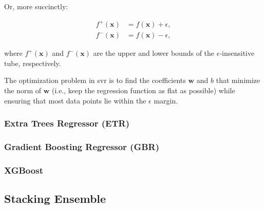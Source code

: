 Or, more succinctly:

$$
\begin{aligned}
    f^+(\mathbf{x}) &= f(\mathbf{x}) + \epsilon, \\
    f^-(\mathbf{x}) &= f(\mathbf{x}) - \epsilon,
\end{aligned}
$$

where $f^+(\mathbf{x})$ and $f^-(\mathbf{x})$ are the upper and lower bounds of the $\epsilon$-insensitive tube, respectively.

The optimization problem in \gls{svr} is to find the coefficients $\mathbf{w}$ and $b$ that minimize the norm of $\mathbf{w}$ (i.e., keep the regression function as flat as possible) while ensuring that most data points lie within the $\epsilon$ margin.

\subsubsection{Extra Trees Regressor (ETR)}

\subsubsection{Gradient Boosting Regressor (GBR)}

\subsubsection{XGBoost}

\subsection{Stacking Ensemble}
